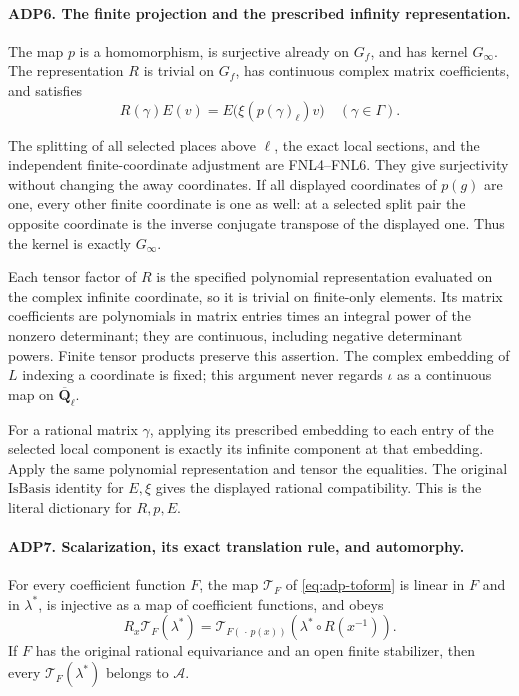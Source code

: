 \paragraph{ADP6. The finite projection and the prescribed infinity representation.}
\label{claim:ADP6}
The map \(p\) is a homomorphism, is surjective already on \(G_f\),
and has kernel \(G_\infty\).  The representation \(R\) is trivial on
\(G_f\), has continuous complex matrix coefficients, and satisfies
\[
 R(\gamma)E(v)=E\bigl(\xi(p(\gamma)_\ell)v\bigr)
                       \quad(\gamma\in\Gamma).
\]

The splitting of all selected places above \(\ell\), the exact local
sections, and the independent finite-coordinate adjustment are FNL4--FNL6.
They give surjectivity without changing the away coordinates.  If all
displayed coordinates of \(p(g)\) are one, every other finite coordinate
is one as well: at a selected split pair the opposite coordinate is the
inverse conjugate transpose of the displayed one.  Thus the kernel is
exactly \(G_\infty\).

Each tensor factor of \(R\) is the specified polynomial representation
evaluated on the complex infinite coordinate, so it is trivial on
finite-only elements.  Its matrix coefficients are polynomials in matrix
entries times an integral power of the nonzero determinant; they are
continuous, including negative determinant powers.  Finite tensor products
preserve this assertion.  The complex embedding of \(L\) indexing a
coordinate is fixed; this argument never regards \(\iota\) as a
continuous map on \(\overline{\mathbf Q}_\ell\).

For a rational matrix \(\gamma\), applying its prescribed embedding
to each entry of the selected local component is exactly its infinite
component at that embedding.  Apply the same polynomial representation
and tensor the equalities.  The original \(\mathrm{IsBasis}\) identity
for \(E,\xi\) gives the displayed rational compatibility.  This is the
literal dictionary for \(R,p,E\).

\paragraph{ADP7. Scalarization, its exact translation rule, and automorphy.}
\label{claim:ADP7}
For every coefficient function \(F\), the map \(\mathcal T_F\) of
\eqref{eq:adp-toform} is linear in \(F\) and in \(\lambda^*\), is
injective as a map of coefficient functions, and obeys
\[
 R_x\mathcal T_F(\lambda^*)
  =\mathcal T_{F(\,\cdot\,p(x))}
                    (\lambda^*\circ R(x^{-1})).
\]
If \(F\) has the original rational equivariance and an open finite
stabilizer, then every \(\mathcal T_F(\lambda^*)\) belongs to
\(\mathcal A\).

